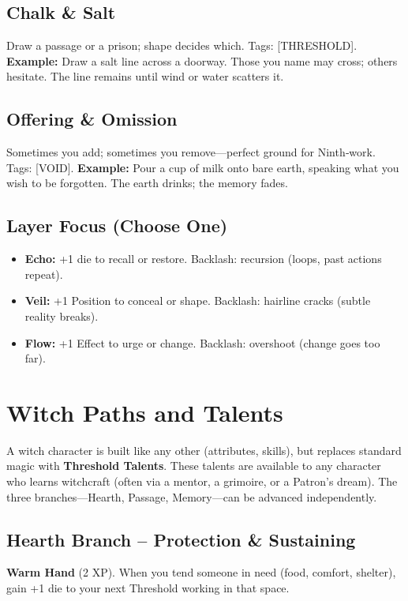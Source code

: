 \documentclass[10pt,a5paper]{book}
\begin{document}
\subsection{Chalk \& Salt}
Draw a passage or a prison; shape decides which. Tags: [THRESHOLD].
\textbf{Example:} Draw a salt line across a doorway. Those you name may cross; others hesitate. The line remains until wind or water scatters it.

\subsection{Offering \& Omission}
Sometimes you add; sometimes you remove---perfect ground for Ninth‑work. Tags: [VOID].
\textbf{Example:} Pour a cup of milk onto bare earth, speaking what you wish to be forgotten. The earth drinks; the memory fades.

\subsection{Layer Focus (Choose One)}
\begin{itemize}
    \item \textbf{Echo:} +1 die to recall or restore. Backlash: recursion (loops, past actions repeat).
    \item \textbf{Veil:} +1 Position to conceal or shape. Backlash: hairline cracks (subtle reality breaks).
    \item \textbf{Flow:} +1 Effect to urge or change. Backlash: overshoot (change goes too far).
\end{itemize}

\section{Witch Paths and Talents}

A witch character is built like any other (attributes, skills), but replaces standard magic with \textbf{Threshold Talents}. These talents are available to any character who learns witchcraft (often via a mentor, a grimoire, or a Patron's dream). The three branches---Hearth, Passage, Memory---can be advanced independently.

\subsection{Hearth Branch -- Protection \& Sustaining}

\textbf{Warm Hand} (2 XP). When you tend someone in need (food, comfort, shelter), gain +1 die to your next Threshold working in that space.
\end{document}

